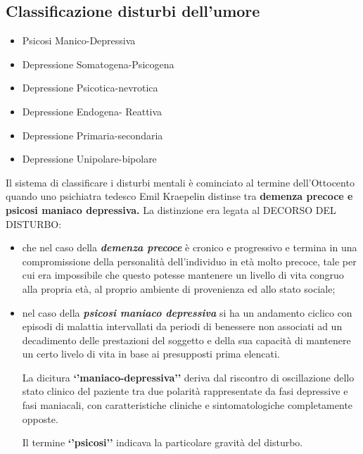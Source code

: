 \subsection{Classificazione disturbi dell'umore}

\begin{itemize}
\item
  Psicosi Manico-Depressiva
\item
  Depressione Somatogena-Psicogena
\item
  Depressione Psicotica-nevrotica
\item
  Depressione Endogena- Reattiva
\item
  Depressione Primaria-secondaria
\item
  Depressione Unipolare-bipolare
\end{itemize}

Il sistema di classificare i disturbi mentali è cominciato al termine
dell'Ottocento quando uno psichiatra tedesco Emil Kraepelin distinse tra
\textbf{demenza precoce e psicosi maniaco depressiva.} La distinzione
era legata al DECORSO DEL DISTURBO:

\begin{itemize}
\item
  che nel caso della \emph{\textbf{demenza precoce}} è cronico e
  progressivo e termina in una compromissione della personalità
  dell'individuo in età molto precoce, tale per cui era impossibile che
  questo potesse mantenere un livello di vita congruo alla propria età,
  al proprio ambiente di provenienza ed allo stato sociale;
\item
  nel caso della \emph{\textbf{psicosi maniaco depressiva}} si ha un
  andamento ciclico con episodi di malattia intervallati da periodi di
  benessere non associati ad un decadimento delle prestazioni del
  soggetto e della sua capacità di mantenere un certo livelo di vita in
  base ai presupposti prima elencati.

  La dicitura \textbf{`'maniaco-depressiva''} deriva dal riscontro di
  oscillazione dello stato clinico del paziente tra due polarità
  rappresentate da fasi depressive e fasi maniacali, con caratteristiche
  cliniche e sintomatologiche completamente opposte.

  Il termine \textbf{`'psicosi''} indicava la particolare gravità del
  disturbo.
\end{itemize}

